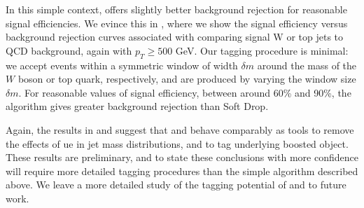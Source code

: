    In this simple context,  offers slightly better background rejection for reasonable signal efficiencies.
   We evince this in , where we show the signal efficiency versus background rejection curves associated with comparing signal W or top jets to QCD background, again with \(p_T \geq 500\) GeV.
   Our tagging procedure is minimal:
   we accept events within a symmetric window of width \(\delta m\) around the mass of the \(W\) boson or top quark, respectively, and  are produced by varying the window size \(\delta m\).
   For reasonable values of signal efficiency, between around 60\% and 90\%, the  algorithm gives greater background rejection than Soft Drop.

   Again, the results in  and  suggest that  and  behave comparably as tools to remove the effects of \gls{ue} in jet mass distributions, and to tag underlying boosted object.
   These results are preliminary, and to state these conclusions with more confidence will require more detailed tagging procedures than the simple algorithm described above.
   We leave a more detailed study of the tagging potential of  and \PIRANHA{} to future work.


